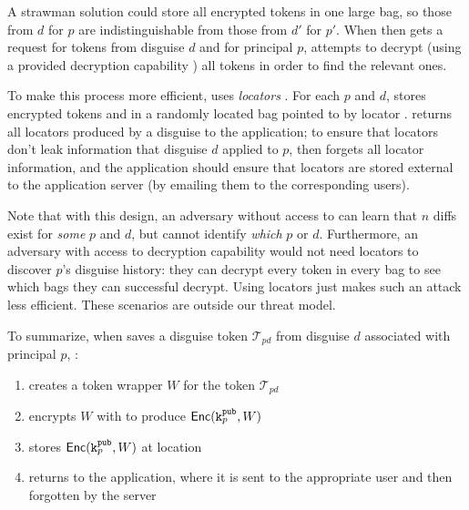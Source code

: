 A strawman solution could store all encrypted tokens in one large bag, so those from
$d$ for $p$ are indistinguishable from those from $d'$ for $p'$. When \sys then gets a request for
tokens from disguise $d$ and for principal $p$, \sys attempts to decrypt (using a provided
decryption capability ) all tokens in order to find the relevant ones.

To make this process more efficient, \sys uses \emph{locators }. For each $p$ and $d$,
\sys stores encrypted tokens  and  in a randomly located bag pointed to by
locator . \sys returns all locators produced by a disguise to the application; to ensure
that locators don't leak information that disguise $d$ applied to $p$, \sys then forgets all locator
information, and the application should ensure that locators are stored external to the application
server (\eg by emailing them to the corresponding users).

Note that with this design, an adversary without access to  can learn that $n$ diffs exist
for \emph{some} $p$ and $d$, but cannot identify \emph{which} $p$ or $d$. 
%
Furthermore, an adversary with access to decryption capability  would not need locators to
discover $p$'s disguise history: they can decrypt every token in every bag to see which bags they
can successful decrypt. Using locators just makes such an attack less efficient.
%
These scenarios are outside our threat model.


To summarize, when \sys saves a disguise token $\mathcal{T}_{pd}$ from disguise $d$ associated with principal $p$, \sys:
\begin{enumerate}
    \item creates a token wrapper $W$ for the token $\mathcal{T}_{pd}$
    \item encrypts $W$ with  to produce $\mathsf{Enc}(\texttt{\ensuremath{\texttt{k}^{\text{pub}}_{p}}}, W)$
    \item stores $\mathsf{Enc}(\texttt{\ensuremath{\texttt{k}^{\text{pub}}_{p}}}, W)$ at location 
    \item returns  to the application, where it is sent to the appropriate user and then
        forgotten by the server
\end{enumerate}

